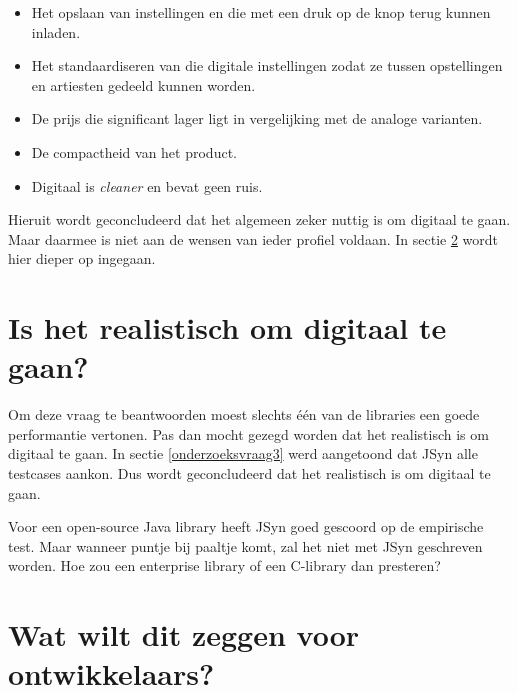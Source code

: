 \begin{itemize}
	\item Het opslaan van instellingen en die met een druk op de knop terug kunnen inladen.
	\item Het standaardiseren van die digitale instellingen zodat ze tussen opstellingen en artiesten gedeeld kunnen worden.
	\item De prijs die significant lager ligt in vergelijking met de analoge varianten.
	\item De compactheid van het product.
	\item Digitaal is \textit{cleaner} en bevat geen ruis.
\end{itemize}

Hieruit wordt geconcludeerd dat het algemeen zeker nuttig is om digitaal te gaan. Maar daarmee is niet aan de wensen van ieder profiel voldaan. In sectie \ref{endeontwikkelaars} wordt hier dieper op ingegaan.

\section{Is het realistisch om digitaal te gaan?}

Om deze vraag te beantwoorden moest slechts één van de libraries een goede performantie vertonen. Pas dan mocht gezegd worden dat het realistisch is om digitaal te gaan. In sectie \ref{onderzoeksvraag3} werd aangetoond dat JSyn alle testcases aankon. Dus wordt geconcludeerd dat het realistisch is om digitaal te gaan.

Voor een open-source Java library heeft JSyn goed gescoord op de empirische test. Maar wanneer puntje bij paaltje komt, zal het niet met JSyn geschreven worden. Hoe zou een enterprise library of een C-library dan presteren? 

\section{Wat wilt dit zeggen voor ontwikkelaars?}
\label{endeontwikkelaars}

